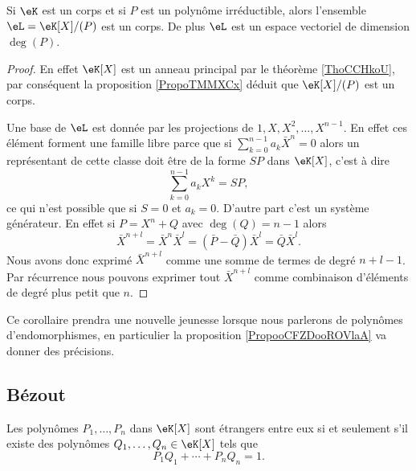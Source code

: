 \begin{corollary}       \label{CorsLGiEN}
    Si \( \eK\) est un corps et si \( P\) est un polynôme irréductible, alors l'ensemble \( \eL=\eK[X]/(P)\) est un corps. De plus \( \eL\) est un espace vectoriel de dimension \( \deg(P)\).
\end{corollary}

\begin{proof}
    En effet \( \eK[X]\) est un anneau principal par le théorème \ref{ThoCCHkoU}, par conséquent la proposition \ref{PropoTMMXCx} déduit que \( \eK[X]/(P)\) est un corps.

    Une base de \( \eL\) est donnée par les projections de \( 1,X,X^2,\ldots, X^{n-1}\). En effet ces élément forment une famille libre parce que si \( \sum_{k=0}^{n-1}a_k\bar X^n=0\) alors un représentant de cette classe doit être de la forme \( SP\) dans \( \eK[X]\), c'est à dire
    \begin{equation}
        \sum_{k=0}^{n-1}a_kX^k=SP,
    \end{equation}
    ce qui n'est possible que si \( S=0\) et \( a_k=0\). D'autre part c'est un système générateur. En effet si \( P=X^n+Q\) avec \( \deg(Q)=n-1\) alors
    \begin{equation}
        \bar X^{n+l}=\bar X^n\bar X^l=(\bar P-\bar Q)\bar X^l=\bar Q\bar X^l.
    \end{equation}
    Nous avons donc exprimé \( \bar X^{n+l}\) comme une somme de termes de degré \( n+l-1\). Par récurrence nous pouvons exprimer tout \( \bar X^{n+l}\) comme combinaison d'éléments de degré plus petit que \( n\).
\end{proof}

\begin{remark}
    Ce corollaire prendra une nouvelle jeunesse lorsque nous parlerons de polynômes d'endomorphismes, en particulier la proposition \ref{PropooCFZDooROVlaA} va donner des précisions.
\end{remark}

\subsection{Bézout}

\begin{theorem}[Bézout] \label{ThoBezoutOuGmLB}     
    Les polynômes \( P_1,\ldots,P_n\) dans \( \eK[X]\) sont étrangers entre eux si et seulement s'il existe des polynômes \( Q_1,\ldots,Q_n\in\eK[X]\) tels que
    \begin{equation}
        P_1Q_1+\cdots+P_nQ_n=1.
    \end{equation}
\end{theorem}

